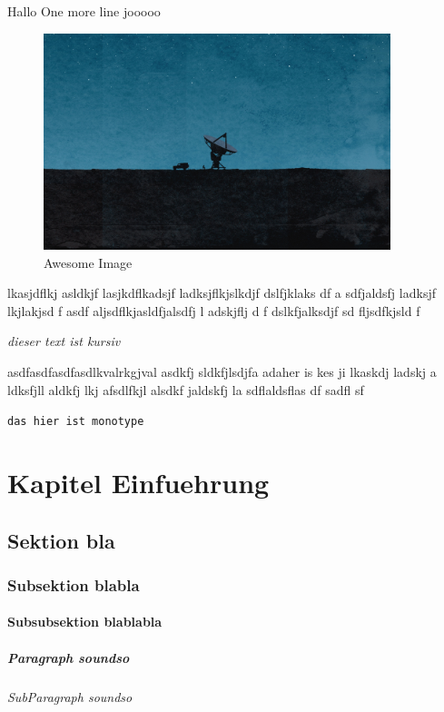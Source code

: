 \documentclass[11pt,a4paper,oneside]{report}
\begin{document}
Hallo %
One more line %
jooooo \cite{Senn2009}

\begin{figure}[h] %
    \centering
    \includegraphics[width=0.9\textwidth]{./images/image.jpg}
    \caption{Awesome Image}
    \label{fig:awesome_image}
\end{figure}

lkasjdflkj asldkjf lasjkdflkadsjf ladksjflkjslkdjf    dslfjklaks df a sdfjaldsfj  ladksjf lkjlakjsd f asdf aljsdflkjasldfjalsdfj l adskjflj d f dslkfjalksdjf sd fljsdfkjsld f

\emph{dieser text ist kursiv}

asdfasdfasdfasdlkvalrkgjval  asdkfj  sldkfjlsdjfa adaher is kes ji lkaskdj ladskj a ldksfjll aldkfj lkj afsdlfkjl alsdkf jaldskfj la sdflaldsflas df sadfl sf

\texttt{das hier ist monotype}


\chapter{Kapitel Einfuehrung}
\section{Sektion bla}
\subsection{Subsektion blabla}
\subsubsection{Subsubsektion blablabla}
\paragraph{Paragraph soundso}
\subparagraph{SubParagraph soundso}

\begin{abstract}
...
\end{abstract}

\tableofcontents

\listoffigures

\listoftables

\appendix


\end{document}
